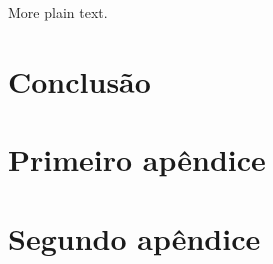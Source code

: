 \documentclass{abntex2}
\begin{document}
More plain text.

\lipsum[18-20]



\chapter*{Conclusão}

\lipsum[21-23]




\appendix

\chapter{Primeiro apêndice}

\lipsum[50-52]

\chapter{Segundo apêndice}
\lipsum[55-57]


% 
% 
% 
\end{document}
